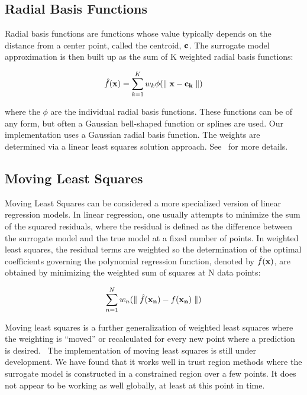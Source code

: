 \documentclass{article}
\begin{document}
\subsection{Radial Basis Functions}\label{models:surf:rbf}

Radial basis functions are functions whose value typically depends on the 
distance from a center point, called the centroid, ${\bf c}$. 
The surrogate model approximation is then built up as the sum of K 
weighted radial basis functions: 

\begin{equation}
  \hat{f}({\bf x})=\sum_{k=1}^{K}w_{k}\phi({\parallel {\bf x} - {\bf c_{k}} \parallel})
  \label{models:surf:equation11}  
\end{equation}

where the $\phi$ are the individual radial basis functions.  
These functions can be of any form, but often a Gaussian bell-shaped 
function or splines are used.  
Our implementation uses a Gaussian radial basis function. 
The weights are determined via a linear least squares solution approach.
See~\cite{orr} for more details.

\subsection{Moving Least Squares}\label{models:surf:mls}

Moving Least Squares can be considered a more specialized 
version of linear regression models.  In linear regression, 
one usually attempts to minimize the sum of the squared residuals, 
where the residual is defined as the difference between the 
surrogate model and the true model at a fixed number of points. 
In weighted least squares, the residual terms are weighted so the 
determination of the optimal coefficients governing the polynomial 
regression function, denoted by $\hat{f}({\bf x})$, are obtained by 
minimizing the weighted sum of squares at N data points: 

\begin{equation}
  \sum_{n=1}^{N}w_{n}({\parallel \hat{f}({\bf x_{n}})-f({\bf x_{n}})\parallel})
  \label{models:surf:equation12}  
\end{equation}

Moving least squares is a further generalization of weighted least squares
where the weighting is ``moved'' or recalculated for every new point where 
a prediction is desired.~\cite{nealen}  The implementation of 
moving least squares 
is still under development.  We have found that it works well 
in trust region methods where the surrogate model is constructed in 
a constrained region over a few points.  It does not appear to be working 
as well globally, at least at this point in time.
\end{document}
